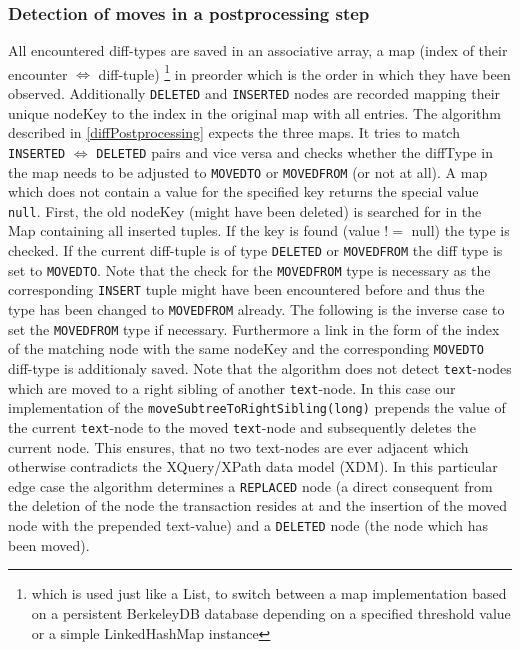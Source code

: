 \subsubsection{Detection of moves in a postprocessing step} All encountered diff-types are saved in an associative array, a map (index of their encounter $\Leftrightarrow$ diff-tuple) \footnote{which is used just like a List, to switch between a map implementation based on a persistent  BerkeleyDB database depending on a specified threshold value or a simple LinkedHashMap instance} in preorder which is the order in which they have been observed. Additionally \texttt{DELETED} and \texttt{INSERTED} nodes are recorded mapping their unique nodeKey to the index in the original map with all entries. The algorithm described in \ref{diffPostprocessing} expects the three maps. It tries to match \texttt{INSERTED} $\Leftrightarrow$ \texttt{DELETED} pairs and vice versa and checks whether the diffType in the map needs to be adjusted to \texttt{MOVEDTO} or \texttt{MOVEDFROM} (or not at all). A map which does not contain a value for the specified key returns the special value \texttt{null}. First, the old nodeKey (might have been deleted) is searched for in the Map containing all inserted tuples. If the key is found (value $!=$ null) the type is checked. If the current diff-tuple is of type \texttt{DELETED} or \texttt{MOVEDFROM} the diff type is set to \texttt{MOVEDTO}. Note that the check for the \texttt{MOVEDFROM} type is necessary as the corresponding \texttt{INSERT} tuple might have been encountered before and thus the type has been changed to \texttt{MOVEDFROM} already. The following is the inverse case to set the \texttt{MOVEDFROM} type if necessary. Furthermore a link in the form of the index of the matching node with the same nodeKey and the corresponding \texttt{MOVEDTO} diff-type is additionaly saved. Note that the algorithm does not detect \texttt{text}-nodes which are moved to a right sibling of another \texttt{text}-node. In this case our implementation of the \texttt{moveSubtreeToRightSibling(long)} prepends the value of the current \texttt{text}-node to the moved \texttt{text}-node and subsequently deletes the current node. This ensures, that no two text-nodes are ever adjacent which otherwise contradicts the XQuery/XPath data model (XDM). In this particular edge case the algorithm determines a \texttt{REPLACED} node (a direct consequent from the deletion of the node the transaction resides at and the insertion of the moved node with the prepended text-value) and a \texttt{DELETED} node (the node which has been moved).

